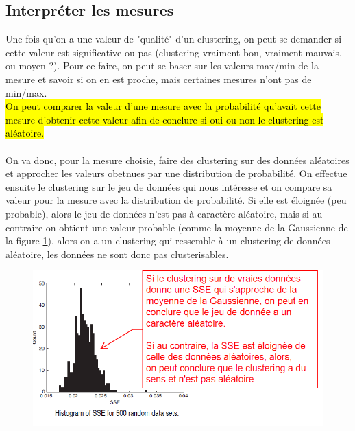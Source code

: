 \documentclass[letterpaper, 12pt]{article}
\newcommand{\alinea}{
\hspace*{0.5cm}}
\begin{document}
		\subsection{Interpréter les mesures}
			\alinea Une fois qu'on a une valeur de "qualité" d'un 
				clustering, on peut se demander si cette valeur est
				significative ou pas (clustering vraiment bon, 
				vraiment mauvais, ou moyen ?). Pour ce faire, on 
				peut se baser sur les valeurs max/min de la 
				mesure et savoir si on en est proche, mais certaines
				mesures n'ont pas de min/max.\\
			\alinea \hl{On peut comparer la valeur d'une 
				mesure avec la probabilité qu'avait cette
				mesure d'obtenir cette valeur afin de 
				conclure si oui ou 
				non le clustering est aléatoire.}\\
			~\\
			\alinea On va donc, pour la mesure choisie, faire
				des clustering sur des données aléatoires et
				approcher les valeurs obetnues par une distribution
				de probabilité. On effectue ensuite le clustering 
				sur le jeu de données qui nous intéresse et 
				on compare sa valeur pour la mesure avec la distribution
				de probabilité. Si elle est éloignée (peu probable), 
				alors le jeu de données n'est pas à caractère aléatoire,
				mais si au contraire on obtient une valeur probable
				(comme la moyenne de la Gaussienne de la figure 
				\ref{fig:eval:random}), alors on a un clustering 
				qui ressemble à un clustering de données aléatoire, 
				les données ne sont donc pas clusterisables.
			\begin{figure}[H]
				\centering
				\includegraphics[scale=0.65]{Images/random.png}
				\caption{}
				\label{fig:eval:random}
			\end{figure}\noindent
%
\end{document}
